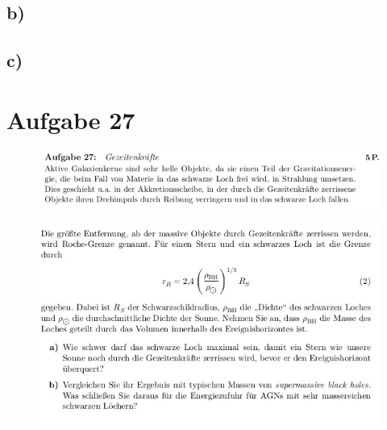 \subsection{b)}


\subsection{c)}


\section{Aufgabe 27}
\begin{figure}[H]
    \centering
    \includegraphics[width=\textwidth]{images/ex27_1.jpg}
\end{figure}
\begin{figure}[H]
    \centering
    \includegraphics[width=\textwidth]{images/ex27_2.jpg}
\end{figure}



